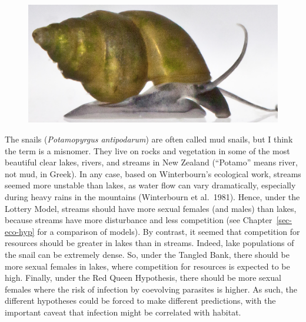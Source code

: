 \documentclass[
  letterpaper,
]{book}
\begin{document}
\begin{figure}


{\centering \includegraphics{images/fig3-4.png}

}

\end{figure}

The snails (\emph{Potamopyrgus antipodarum}) are often called mud
snails, but I think the term is a misnomer. They live on rocks and
vegetation in some of the most beautiful clear lakes, rivers, and
streams in New Zealand (``Potamo'' means river, not mud, in Greek). In
any case, based on Winterbourn's ecological work, streams seemed more
unstable than lakes, as water flow can vary dramatically, especially
during heavy rains in the mountains (Winterbourn et al.~1981). Hence,
under the Lottery Model, streams should have more sexual females (and
males) than lakes, because streams have more disturbance and less
competition (see Chapter~\ref{sec-eco-hyp} for a comparison of models).
By contrast, it seemed that competition for resources should be greater
in lakes than in streams. Indeed, lake populations of the snail can be
extremely dense. So, under the Tangled Bank, there should be more sexual
females in lakes, where competition for resources is expected to be
high. Finally, under the Red Queen Hypothesis, there should be more
sexual females where the risk of infection by coevolving parasites is
higher. As such, the different hypotheses could be forced to make
different predictions, with the important caveat that infection might be
correlated with habitat.
\end{document}
